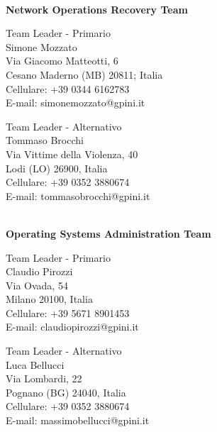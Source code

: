 \documentclass[12pt, a4paper, titlepage]{report}
\begin{document}
	\vspace{0.5cm}
	\centerline{\textbf{\\Network Operations Recovery Team}}
	\begin{paracol}{2}
		\setlength{\columnsep}{5em}
		\begin{leftcolumn}
			\begin{adjustwidth}{0.5cm}{}
				Team Leader - Primario \\
				Simone Mozzato\\
				Via Giacomo Matteotti, 6\\ 
				Cesano Maderno (MB) 20811; Italia
				\\Cellulare:  +39 0344 6162783 \\
				E-mail:  simonemozzato@gpini.it 
			\end{adjustwidth}
		\end{leftcolumn}
		\begin{rightcolumn}
			\begin{adjustwidth}{0.5cm}{}
				Team Leader - Alternativo \\
				Tommaso Brocchi\\
				Via Vittime della Violenza, 40\\ 
				Lodi (LO) 26900, Italia \\
				Cellulare:  +39 0352 3880674 \\
				E-mail: tommasobrocchi@gpini.it 
			\end{adjustwidth}
		\end{rightcolumn}
	\end{paracol}
	
	\vspace{0.5cm}
	\centerline{\textbf{\\Operating Systems Administration Team}}
	\begin{paracol}{2}
		\setlength{\columnsep}{5em}
		\begin{leftcolumn}
			\begin{adjustwidth}{0.5cm}{}
				Team Leader - Primario \\
				Claudio Pirozzi \\
				Via Ovada, 54\\ 
				Milano 20100, Italia \\
				Cellulare:  +39 5671 8901453 \\
				E-mail:  claudiopirozzi@gpini.it 
			\end{adjustwidth}
		\end{leftcolumn}
		\begin{rightcolumn}
			\begin{adjustwidth}{0.5cm}{}
				Team Leader - Alternativo \\
				Luca Bellucci\\
				Via Lombardi, 22\\ 
				Pognano (BG) 24040, Italia \\
				Cellulare:  +39 0352 3880674 \\
				E-mail: massimobellucci@gpini.it 
			\end{adjustwidth}
		\end{rightcolumn}
	\end{paracol}
	
\end{document}
